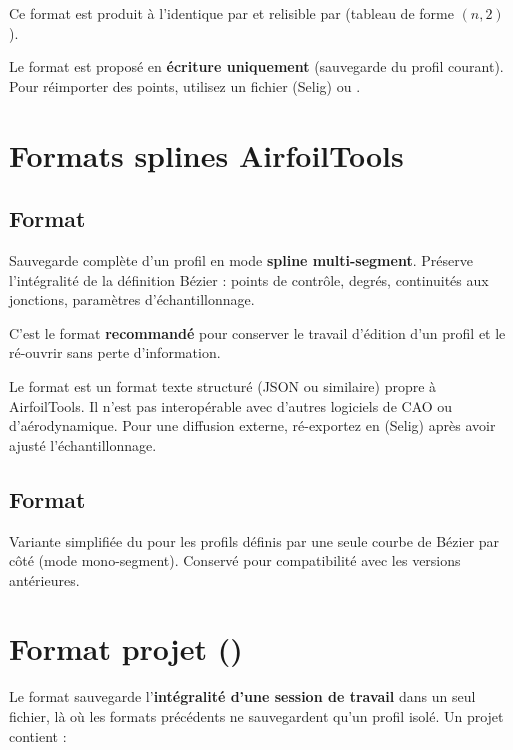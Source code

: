 Ce format est produit à l'identique par  et
relisible par  (tableau de forme $(n, 2)$).

\begin{noteinfo}
Le format  est proposé en \textbf{écriture uniquement}
(sauvegarde du profil courant). Pour réimporter des points,
utilisez un fichier  (Selig) ou .
\end{noteinfo}

\section{Formats splines AirfoilTools}

\subsection{Format }

Sauvegarde complète d'un profil en mode \textbf{spline
multi-segment}. Préserve l'intégralité de la définition Bézier :
points de contrôle, degrés, continuités aux jonctions, paramètres
d'échantillonnage.

C'est le format \textbf{recommandé} pour conserver le travail
d'édition d'un profil et le ré-ouvrir sans perte d'information.

\begin{noteinfo}
Le format  est un format texte structuré (JSON
ou similaire) propre à AirfoilTools. Il n'est pas
interopérable avec d'autres logiciels de CAO ou
d'aérodynamique. Pour une diffusion externe, ré-exportez en
 (Selig) après avoir ajusté l'échantillonnage.
\end{noteinfo}

\subsection{Format }

Variante simplifiée du  pour les profils définis
par une seule courbe de Bézier par côté (mode mono-segment).
Conservé pour compatibilité avec les versions antérieures.

\section{Format projet ()}
\label{sec:aftproj}

Le format  sauvegarde l'\textbf{intégralité d'une
session de travail} dans un seul fichier, là où les formats
précédents ne sauvegardent qu'un profil isolé. Un projet contient :

